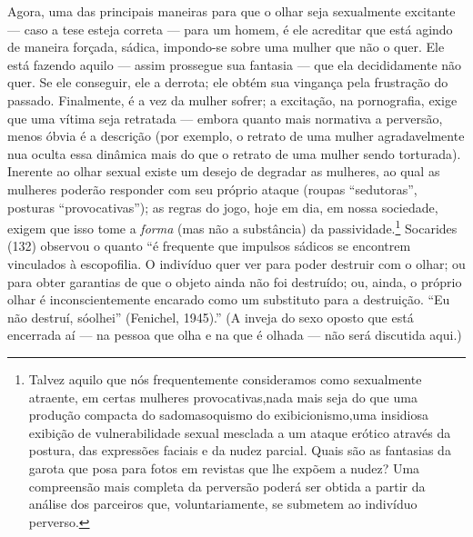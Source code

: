 Agora, uma das principais maneiras para que o olhar seja sexualmente
excitante --- caso a tese esteja correta --- para um homem, é ele
acreditar que está agindo de maneira forçada, sádica, impondo-se sobre
uma mulher que não o quer. Ele está fazendo aquilo --- assim prossegue
sua fantasia --- que ela decididamente não quer. Se ele conseguir, ele
a derrota; ele obtém sua vingança pela frustração do passado.
Finalmente, é a vez da mulher sofrer; a excitação, na pornografia,
exige que uma vítima seja retratada --- embora quanto mais normativa a
perversão, menos óbvia é a descrição (por exemplo, o retrato de uma
mulher agradavelmente nua oculta essa dinâmica mais do que o retrato de
uma mulher sendo torturada). Inerente ao olhar sexual existe um desejo
de degradar as mulheres, ao qual as mulheres poderão responder com seu
próprio ataque (roupas\idxroup{} ``sedutoras'',
posturas ``provocativas''); as regras do
jogo, hoje em dia, em nossa sociedade, exigem que isso tome a
\textit{forma} (mas não a substância) da passividade.\footnote{ Talvez
aquilo que nós frequentemente consideramos como sexualmente atraente,
em certas mulheres provocativas,\idxroup[|nn] nada mais seja do que uma produção
compacta do sadomasoquismo do exibicionismo,\idxexibiatra[|nn] uma insidiosa exibição de
vulnerabilidade sexual mesclada a um ataque erótico através da postura,
das expressões faciais e da nudez parcial. Quais são as fantasias da
garota que posa para fotos em revistas que lhe expõem a nudez? Uma
compreensão mais completa da perversão poderá ser obtida a partir da
análise dos parceiros que, voluntariamente, se submetem ao indivíduo
perverso.} Socarides\idxsocar{} (132) observou o quanto ``é
frequente que impulsos sádicos se encontrem vinculados à escopofilia. O
indivíduo quer ver para poder destruir com o olhar; ou para obter
garantias de que o objeto ainda não foi destruído; ou, ainda, o próprio
olhar é inconscientemente encarado como um substituto para a
destruição. ``Eu não destruí, só\idxsadivoye[|)]
olhei'' (Fenichel,\idxfenic{} 1945).'' (A inveja do
sexo oposto que está encerrada aí --- na pessoa que olha e na que é
olhada --- não será discutida aqui.)

